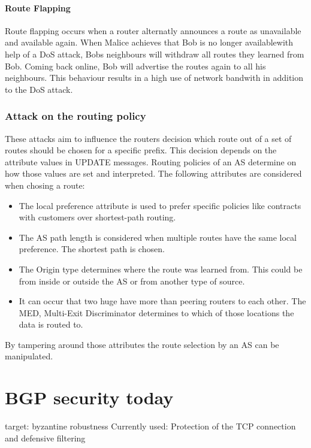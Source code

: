 \documentclass[12pt]{IEEEtran}
\begin{document}
		\paragraph{Route Flapping}
		Route flapping occurs when a router alternatly announces a route as unavailable and available again. When Malice achieves that Bob is no longer availablewith help of a DoS attack, Bobs neighbours will withdraw all routes they learned from Bob. Coming back online, Bob will advertise the routes again to all his neighbours.
		This behaviour results in a high use of network bandwith in addition to the DoS attack. 

		\subsubsection{Attack on the routing policy} 
		
		These attacks aim to influence the routers decision which route out of a set of routes should be chosen for a specific prefix. This decision depends on the attribute values in UPDATE messages. Routing policies of an AS determine on how those values are set and interpreted. The following attributes are considered when chosing a route:
		\begin{itemize}
			\item The local preference attribute is used to prefer specific policies like contracts with customers over shortest-path routing.
			\item The AS path length is considered when multiple routes have the same local preference. The shortest path is chosen.
			\item The Origin type determines where the route was learned from. This could be from inside or outside the AS or from another type of source.
			\item It can occur that two huge have more than peering routers to each other. The MED, Multi-Exit Discriminator determines to which of those locations the data is routed to. 
		\end{itemize}
		By tampering around those attributes the route selection by an AS can be manipulated. 



       \section{BGP security today}
	target:	byzantine robustness
	Currently used: Protection of the TCP connection and defensive filtering
	
\end{document}

